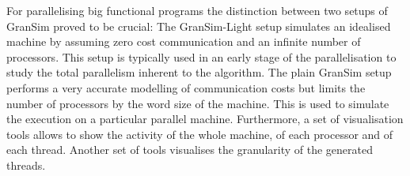 For  parallelising  big functional   programs the  distinction  between two
setups of GranSim  proved to be crucial:  The GranSim-Light setup simulates
an idealised  machine by assuming zero cost  communication  and an infinite
number of processors. This setup is typically used in an early stage of the
parallelisation to study the  total parallelism inherent  to the algorithm. 
The plain GranSim setup performs a very accurate modelling of communication
costs but limits the number of processors by the word size  of the machine. 
This is used to  simulate the execution  on a particular parallel machine.  
Furthermore, a  set of visualisation tools  allows to  show the activity of
the  whole machine, of  each processor and  of each thread.  Another set of
tools visualises the granularity of the generated threads.
 




